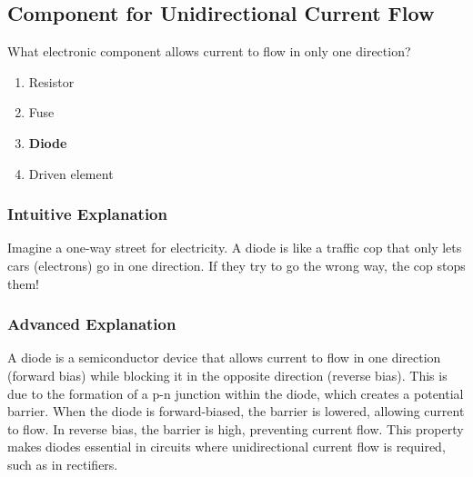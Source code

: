 \subsection{Component for Unidirectional Current Flow}
\label{T6B02}

\begin{tcolorbox}[colback=gray!10!white,colframe=black!75!black,title=T6B02]
What electronic component allows current to flow in only one direction?
\begin{enumerate}[noitemsep]
    \item Resistor
    \item Fuse
    \item \textbf{Diode}
    \item Driven element
\end{enumerate}
\end{tcolorbox}

\subsubsection*{Intuitive Explanation}
Imagine a one-way street for electricity. A diode is like a traffic cop that only lets cars (electrons) go in one direction. If they try to go the wrong way, the cop stops them!

\subsubsection*{Advanced Explanation}
A diode is a semiconductor device that allows current to flow in one direction (forward bias) while blocking it in the opposite direction (reverse bias). This is due to the formation of a p-n junction within the diode, which creates a potential barrier. When the diode is forward-biased, the barrier is lowered, allowing current to flow. In reverse bias, the barrier is high, preventing current flow. This property makes diodes essential in circuits where unidirectional current flow is required, such as in rectifiers.